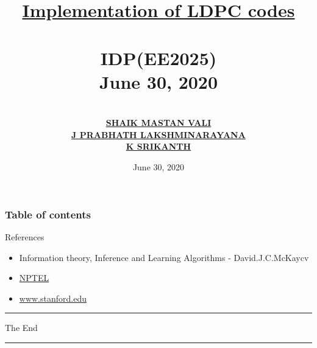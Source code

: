 \documentclass[9pt]{beamer}
\title[short title]{\underline{\Huge Implementation of LDPC codes}\\~\\ \Large IDP(EE2025) \\ \Large June 30, 2020}
\author{\\ \underline{ \textbf{SHAIK MASTAN VALI}} \\ \underline{ \textbf{J\; PRABHATH LAKSHMINARAYANA}}\\ \underline{\textbf{K \;SRIKANTH}}\\}
\institute{\textbf{\underline{\large Mentor}: Dr. Shashank Vatedka} \\ \textbf{\large INDIAN INSTITUTE OF TECHNOLOGY, HYDERABAD}}
\date{June 30, 2020}
\begin{document}
\titlepage

\begin{frame}
 \frametitle{Table of contents}
 \tableofcontents
\end{frame}






\begin{frame}
    \begin{alertblock} {References}
    \begin{itemize}
        \item Information theory, Inference and Learning Algorithms - David.J.C.McKaycv
        \item  \href{https://nptel.ac.in/}{NPTEL}
        \item \href{https://www.stanford.edu/}{www.stanford.edu}
    \end{itemize}
    \end{alertblock}
\end{frame}

\begin{frame}
\noindent
{\color{purple} \rule{\linewidth}{0.5mm} }
\color{purple}
\Huge{\centerline{The End}}
\noindent
{\color{purple} \rule{\linewidth}{0.5mm} }
\end{frame}
\end{document}
